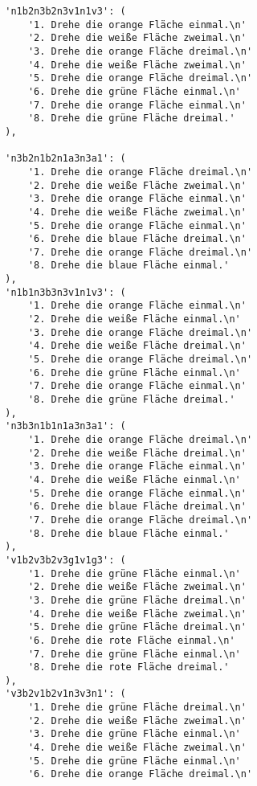 \begin{lstlisting}
        'n1b2n3b2n3v1n1v3': (
            '1. Drehe die orange Fläche einmal.\n'
            '2. Drehe die weiße Fläche zweimal.\n'
            '3. Drehe die orange Fläche dreimal.\n'
            '4. Drehe die weiße Fläche zweimal.\n'
            '5. Drehe die orange Fläche dreimal.\n'
            '6. Drehe die grüne Fläche einmal.\n'
            '7. Drehe die orange Fläche einmal.\n'
            '8. Drehe die grüne Fläche dreimal.'
        ),

        'n3b2n1b2n1a3n3a1': (
            '1. Drehe die orange Fläche dreimal.\n'
            '2. Drehe die weiße Fläche zweimal.\n'
            '3. Drehe die orange Fläche einmal.\n'
            '4. Drehe die weiße Fläche zweimal.\n'
            '5. Drehe die orange Fläche einmal.\n'
            '6. Drehe die blaue Fläche dreimal.\n'
            '7. Drehe die orange Fläche dreimal.\n'
            '8. Drehe die blaue Fläche einmal.'
        ),
        'n1b1n3b3n3v1n1v3': (
            '1. Drehe die orange Fläche einmal.\n'
            '2. Drehe die weiße Fläche einmal.\n'
            '3. Drehe die orange Fläche dreimal.\n'
            '4. Drehe die weiße Fläche dreimal.\n'
            '5. Drehe die orange Fläche dreimal.\n'
            '6. Drehe die grüne Fläche einmal.\n'
            '7. Drehe die orange Fläche einmal.\n'
            '8. Drehe die grüne Fläche dreimal.'
        ),
        'n3b3n1b1n1a3n3a1': (
            '1. Drehe die orange Fläche dreimal.\n'
            '2. Drehe die weiße Fläche dreimal.\n'
            '3. Drehe die orange Fläche einmal.\n'
            '4. Drehe die weiße Fläche einmal.\n'
            '5. Drehe die orange Fläche einmal.\n'
            '6. Drehe die blaue Fläche dreimal.\n'
            '7. Drehe die orange Fläche dreimal.\n'
            '8. Drehe die blaue Fläche einmal.'
        ),
        'v1b2v3b2v3g1v1g3': (
            '1. Drehe die grüne Fläche einmal.\n'
            '2. Drehe die weiße Fläche zweimal.\n'
            '3. Drehe die grüne Fläche dreimal.\n'
            '4. Drehe die weiße Fläche zweimal.\n'
            '5. Drehe die grüne Fläche dreimal.\n'
            '6. Drehe die rote Fläche einmal.\n'
            '7. Drehe die grüne Fläche einmal.\n'
            '8. Drehe die rote Fläche dreimal.'
        ),
        'v3b2v1b2v1n3v3n1': (
            '1. Drehe die grüne Fläche dreimal.\n'
            '2. Drehe die weiße Fläche zweimal.\n'
            '3. Drehe die grüne Fläche einmal.\n'
            '4. Drehe die weiße Fläche zweimal.\n'
            '5. Drehe die grüne Fläche einmal.\n'
            '6. Drehe die orange Fläche dreimal.\n'

\end{lstlisting}
